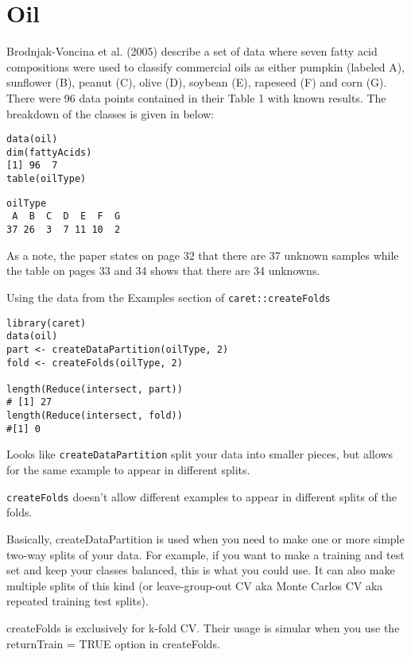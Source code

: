 \documentclass[caret-main.tex]{subfiles}
\begin{document}
\section{Oil}

Brodnjak-Voncina et al. (2005) describe a set of data where seven fatty acid compositions were used to classify commercial oils as either pumpkin (labeled A), sunflower (B), peanut (C), olive (D), soybean (E), rapeseed (F) and corn (G). There were 96 data points contained in their Table 1 with known results. The breakdown of the classes is given in below:

\begin{framed}
\begin{verbatim}
data(oil)
dim(fattyAcids)
[1] 96  7
table(oilType)
\end{verbatim}
\end{framed}
\begin{verbatim}
oilType
 A  B  C  D  E  F  G 
37 26  3  7 11 10  2 
\end{verbatim}
As a note, the paper states on page 32 that there are 37 unknown samples while the table on pages 33 and 34 shows that there are 34 unknowns.


Using the data from the Examples section of \texttt{caret::createFolds}

\begin{framed}
\begin{verbatim}
library(caret) 
data(oil) 
part <- createDataPartition(oilType, 2) 
fold <- createFolds(oilType, 2) 

length(Reduce(intersect, part)) 
# [1] 27 
length(Reduce(intersect, fold)) 
#[1] 0 

\end{verbatim}
\end{framed}

Looks like \texttt{createDataPartition} split your data into smaller pieces, 
but allows for the same example to appear in different splits. 

\texttt{createFolds} doesn't allow different examples to appear in different 
splits of the folds. 


Basically, createDataPartition is used when you need to make one or 
more simple two-way splits of your data. For example, if you want to 
make a training and test set and keep your classes balanced, this is 
what you could use. It can also make multiple splits of this kind (or 
leave-group-out CV aka Monte Carlos CV aka repeated training test 
splits). 

createFolds is exclusively for k-fold CV. Their usage is simular when 
you use the returnTrain = TRUE option in createFolds. 

\end{document}

